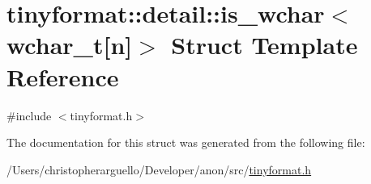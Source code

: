 \hypertarget{structtinyformat_1_1detail_1_1is__wchar_3_01wchar__t[n]_4}{}\section{tinyformat\+:\+:detail\+:\+:is\+\_\+wchar$<$ wchar\+\_\+t\mbox{[}n\mbox{]}$>$ Struct Template Reference}
\label{structtinyformat_1_1detail_1_1is__wchar_3_01wchar__t[n]_4}


{\ttfamily \#include $<$tinyformat.\+h$>$}



The documentation for this struct was generated from the following file\+:\begin{DoxyCompactItemize}
\item 
/\+Users/christopherarguello/\+Developer/anon/src/\mbox{\hyperlink{tinyformat_8h}{tinyformat.\+h}}\end{DoxyCompactItemize}
